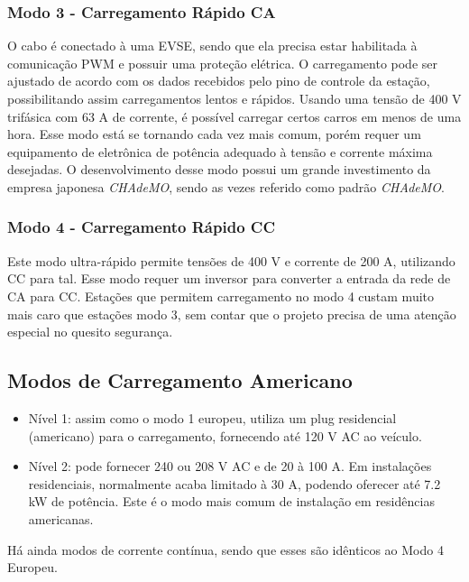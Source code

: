         \subsubsection{Modo 3 - Carregamento Rápido CA}

        O cabo é conectado à uma \ac{EVSE}, sendo que ela precisa estar habilitada à comunicação PWM e possuir uma proteção elétrica. O carregamento pode ser ajustado de acordo com os dados recebidos pelo pino de controle da estação, possibilitando assim carregamentos lentos e rápidos. Usando uma tensão de 400 V trifásica com 63 A de corrente, é possível carregar certos carros em menos de uma hora. Esse modo está se tornando cada vez mais comum, porém requer um equipamento de eletrônica de potência adequado à tensão e corrente máxima desejadas. O desenvolvimento desse modo possui um grande investimento da empresa japonesa \textit{CHAdeMO}, sendo as vezes referido como padrão \textit{CHAdeMO}.

        \subsubsection{Modo 4 - Carregamento Rápido CC}

        Este modo ultra-rápido permite tensões de 400 V e corrente de 200 A, utilizando \ac{CC} para tal. Esse modo requer um inversor para converter a entrada da rede de CA para CC. Estações que permitem carregamento no modo 4 custam muito mais caro que estações modo 3, sem contar que o projeto precisa de uma atenção especial no quesito segurança.

    \subsection{Modos de Carregamento Americano}

      \begin{itemize}
        \item Nível 1: assim como o modo 1 europeu, utiliza um plug residencial (americano) para o carregamento, fornecendo até 120 V AC ao veículo.
        \item Nível 2: pode fornecer 240 ou 208 V AC e de 20 à 100 A. Em instalações residenciais, normalmente acaba limitado à 30 A, podendo oferecer até 7.2 kW de potência. Este é o modo mais comum de instalação em residências americanas.
      \end{itemize}

      Há ainda modos de corrente contínua, sendo que esses são idênticos ao Modo 4 Europeu.

